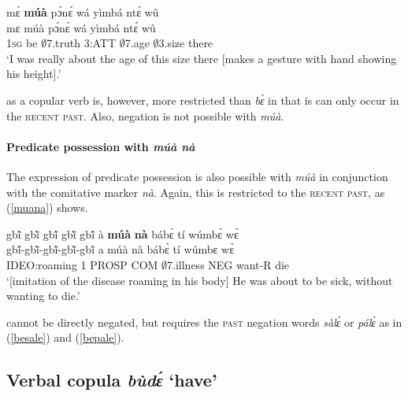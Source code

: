 \begin{exe} 
\ex\label{bemua2}
  \glll mɛ̀ {\bfseries múà} pɔ́nɛ́ wá yìmbá ntɛ́ wû \\
          mɛ múà pɔ́nɛ́ wá yìmbá ntɛ́ wû       \\
         1\textsc{sg} be $\emptyset$7.truth 3:ATT $\emptyset$7.age $\emptyset$3.size there \\
    \trans `I was really about the age of this size there [makes a gesture with hand showing his height].'
\end{exe}

 as a copular verb is, however, more restricted than {\itshape bɛ̀} in that is can only occur in the \textsc{recent past}. Also, negation is not possible with {\itshape múà}.


\paragraph{Predicate possession with {\itshape múà nà}}
The expression of predicate possession is also possible with {\itshape múà} in conjunction with the comitative marker {\itshape nà}. Again, this is restricted to the \textsc{recent past}, as (\ref{muana}) shows.


\begin{exe} 
\ex\label{muana} 
  \glll  gbĩ́ gbĩ̀ gbĩ́ gbĩ̀ gbĩ́   à {\bfseries múà} {\bfseries nà} bábɛ̀ tí wúmbɛ̀ wɛ̀ \\
            gbĩ́-gbĩ̀-gbĩ́-gbĩ̀-gbĩ́  a múà nà bábɛ̀ tí wúmbɛ wɛ̀   \\
         IDEO:roaming 1 PROSP COM $\emptyset$7.illness NEG want-R die \\
    \trans `[imitation of the disease roaming in his body] He was about to be sick, without wanting to die.'
\end{exe}

 cannot be directly negated, but requires the \textsc{past} negation words {\itshape sàlɛ́} or {\itshape pálɛ́} as in (\ref{besale}) and (\ref{bepale}).









\subsection{Verbal copula {\itshape bùdɛ́} `have'}
\label{sec:COPbude}

